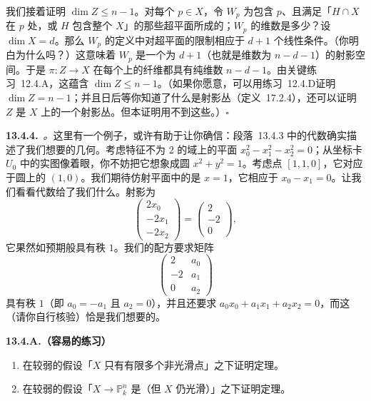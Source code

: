 我们接着证明 $\dim Z\le n-1$。对每个\trClosedPoint{} $p\in X$，令 $W_p$ 为包含 $p$、且满足「$H\cap X$ 在 $p$ 处\trSingular，或 $H$ 包含整个 $X$」的那些超平面所成的\trLocus；$W_p$ 的维数是多少？设 $\dim X=d$。那么 $W_p$ 的定义中对超平面的限制相应于 $d+1$ 个线性条件。（你明白为什么吗？）这意味着 $W_p$ 是一个\trCodimension{}为 $d+1$（也就是维数为 $n-d-1$）的射影空间。于是 $\pi\colon Z\to X$ 在每个\trClosedPoint{}上的纤维都具有纯维数 $n-d-1$。由\mbox{关键练习~12.4.A}，这蕴含 $\dim Z\le n-1$。（如果你愿意，可以用\mbox{练习~12.4.D}证明 $\dim Z=n-1$；并且日后等你知道了什么是射影丛（定义~17.2.4），还可以证明 $Z$ 是 $X$ 上的一个射影丛。但本证明用不到这些。）\hfill$\square$

\textbf{13.4.4.}\ \emph{\trhRemark{}。}\quad 这里有一个例子，或许有助于让你确信：段落~13.4.3 中的代数确实描述了我们想要的几何。考虑特征不为 $2$ 的域上的平面\trConic{} $x_0^2-x_1^2-x_2^2=0$；从坐标卡 $U_0$ 中的实图像着眼，你不妨把它想象成圆 $x^2+y^2=1$。考虑点 $[1,1,0]$，它对应于圆上的 $(1,0)$。我们期待仿射平面中的\trTangentLine{}是 $x=1$，它相应于 $x_0-x_1=0$。让我们看看代数给了我们什么。射影\trJacobianMatrix{}为
\[
\begin{pmatrix} 2x_0\\ -2x_1\\ -2x_2 \end{pmatrix}
=\begin{pmatrix} 2\\ -2\\ 0 \end{pmatrix},
\]
它果然如预期般具有秩 $1$。我们的配方要求矩阵
\[
\begin{pmatrix} 2 & a_0\\ -2 & a_1\\ 0 & a_2 \end{pmatrix}
\]
具有秩 $1$（即 $a_0=-a_1$ 且 $a_2=0$），并且还要求 $a_0x_0+a_1x_1+a_2x_2=0$，而这（请你自行核验）恰是我们想要的。

\textbf{13.4.A.（容易的练习）}
\begin{enumerate}[label=(\alph*)]
\item 在较弱的假设「$X$ 只有有限多个非光滑点」之下证明\trBertini{}定理。
\item 在较弱的假设「$X\to\mathbb{P}^n_k$ 是\trLocallyClosedEmbedding（但 $X$ 仍光滑）」之下证明\trBertini{}定理。
\end{enumerate}

